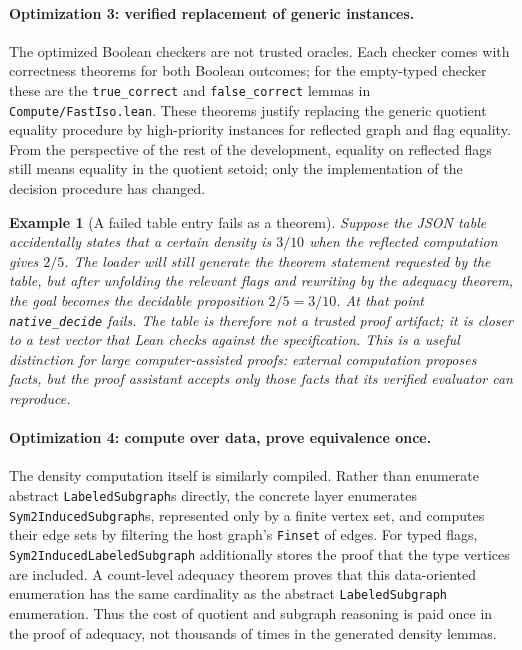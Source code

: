 \documentclass{article}
\newtheorem{example}[theorem]{Example}
\newcommand{\lean}[1]{\texttt{#1}}
\begin{document}
\paragraph{Optimization 3: verified replacement of generic instances.}
The optimized Boolean checkers are not trusted oracles.  Each checker comes
with correctness theorems for both Boolean outcomes; for the empty-typed
checker these are the \lean{true\_correct} and \lean{false\_correct} lemmas
in \lean{Compute/FastIso.lean}.  These theorems justify replacing the generic
quotient equality procedure by high-priority instances for reflected graph
and flag equality.  From the perspective of the rest of the development,
equality on reflected flags still means equality in the quotient setoid;
only the implementation of the decision procedure has changed.

\begin{example}[A failed table entry fails as a theorem]
  Suppose the JSON table accidentally states that a certain density is
  $3/10$ when the reflected computation gives $2/5$.  The loader will still
  generate the theorem statement requested by the table, but after unfolding
  the relevant flags and rewriting by the adequacy theorem, the goal becomes
  the decidable proposition $2/5 = 3/10$.  At that point
  \lean{native\_decide} fails.  The table is therefore not a trusted proof
  artifact; it is closer to a test vector that Lean checks against the
  specification.  This is a useful distinction for large computer-assisted
  proofs: external computation proposes facts, but the proof assistant
  accepts only those facts that its verified evaluator can reproduce.
\end{example}

\paragraph{Optimization 4: compute over data, prove equivalence once.}
The density computation itself is similarly compiled.  Rather than enumerate
abstract \lean{LabeledSubgraph}s directly, the concrete layer enumerates
\lean{Sym2InducedSubgraph}s, represented only by a finite vertex set, and
computes their edge sets by filtering the host graph's \lean{Finset} of
edges.  For typed flags, \lean{Sym2InducedLabeledSubgraph} additionally
stores the proof that the type vertices are included.  A count-level
adequacy theorem proves that this data-oriented enumeration has the same
cardinality as the abstract \lean{LabeledSubgraph} enumeration.  Thus the
cost of quotient and subgraph reasoning is paid once in the proof of
adequacy, not thousands of times in the generated density lemmas.
\end{document}
